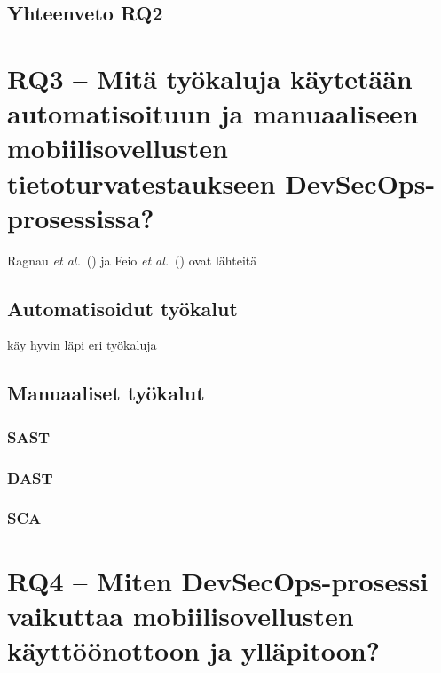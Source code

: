 \documentclass[bscthesis,finnish,oneside,biblatex]{uefcsthesis}
\begin{document}
    \subsection{Yhteenveto RQ2}




    \section{RQ3 – Mitä työkaluja käytetään automatisoituun ja manuaaliseen mobiilisovellusten tietoturvatestaukseen DevSecOps-prosessissa?}
    \label{sec:rq3}

    Ragnau \emph{et al.}\ (\citeyear{rangnau2020_cst}) ja Feio \emph{et al.}\ (\citeyear{feio2024_empirical}) ovat lähteitä

    \subsection{Automatisoidut työkalut}

    \cite{feio2024_empirical} käy hyvin läpi eri työkaluja

    \subsection{Manuaaliset työkalut}

    \subsubsection{SAST}

    \subsubsection{DAST}

    \subsubsection{SCA}



    \section{RQ4 – Miten DevSecOps-prosessi vaikuttaa mobiilisovellusten käyttöönottoon ja ylläpitoon?}
    \label{sec:rq4}
\end{document}
